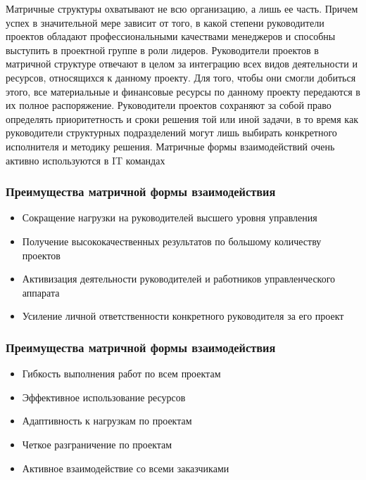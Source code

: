 \documentclass{../industrial-development}
\begin{document}
\lecturenotes
Матричные структуры охватывают не всю организацию, а лишь ее часть. Причем успех в значительной мере зависит от того, в какой степени руководители проектов обладают профессиональными качествами менеджеров и способны выступить в проектной группе в роли лидеров.
Руководители проектов в матричной структуре отвечают в целом за интеграцию всех видов деятельности и ресурсов, относящихся к данному проекту. Для того, чтобы они смогли добиться этого, все материальные и финансовые ресурсы по данному проекту передаются в их полное распоряжение. Руководители проектов сохраняют за собой право определять приоритетность и сроки решения той или иной задачи, в то время как руководители структурных подразделений могут лишь выбирать конкретного исполнителя и методику решения.
Матричные формы взаимодействий очень активно используются в IT  командах

\begin{frame} \frametitle{Преимущества матричной формы взаимодействия}
  
  \begin{itemize}
  \item Сокращение нагрузки на руководителей высшего уровня управления 
  \item Получение высококачественных результатов по большому количеству проектов
  \item Активизация деятельности руководителей и работников управленческого аппарата
  \item Усиление личной ответственности конкретного руководителя за его проект
  \end{itemize}
\end{frame}

\begin{frame} \frametitle{Преимущества матричной формы взаимодействия}
  
  \begin{itemize}
 \item Гибкость выполнения работ по всем проектам
 \item Эффективное использование ресурсов
 \item Адаптивность к нагрузкам по проектам
 \item Четкое разграничение по проектам
 \item Активное взаимодействие со всеми заказчиками
  \end{itemize}
\end{frame}
\end{document}
